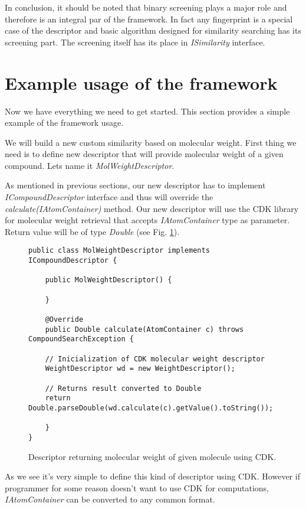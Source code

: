 \documentclass[thesis=M,english]{FITthesis}[2012/10/20]
\begin{document}
In conclusion, it should be noted that binary screening plays a major role and therefore is an integral par of the framework. In fact any fingerprint is a special case of the descriptor and basic algorithm designed for similarity searching has its screening part. The screening itself has its place in \textit{ISimilarity} interface. 

\section{Example usage of the framework}
Now we have everything we need to get started. This section provides a simple example of the framework usage.

We will build a new custom similarity based on molecular weight. First thing we need is to define new descriptor that will provide molecular weight of a given compound. Lets name it \textit{MolWeightDescriptor}.

As mentioned in previous sections, our new descriptor has to implement \textit{ICompoundDescriptor} interface and thus will override the \textit{calculate(IAtomContainer)} method. Our new descriptor will use the CDK library for molecular weight retrieval that accepts \textit{IAtomContainer} type as parameter. Return value will be of type \textit{Double} (see Fig. \ref{MolWeightDescriptorCode}).

\begin{figure}
\begin{lstlisting}
public class MolWeightDescriptor implements ICompoundDescriptor {
    
    public MolWeightDescriptor() {
	
    }

    @Override
    public Double calculate(AtomContainer c) throws CompoundSearchException {
	
	// Inicialization of CDK molecular weight descriptor
	WeightDescriptor wd = new WeightDescriptor();	
	
	// Returns result converted to Double
	return Double.parseDouble(wd.calculate(c).getValue().toString());
	
    } 
}
\end{lstlisting}
\caption{Descriptor returning molecular weight of given molecule using CDK.}
\label{MolWeightDescriptorCode}
\end{figure}

As we see it’s very simple to define this kind of descriptor using CDK. However if programmer for some reason doesn’t want to use CDK for computations, \textit{IAtomContainer} can be converted to any common format. 
\end{document}
